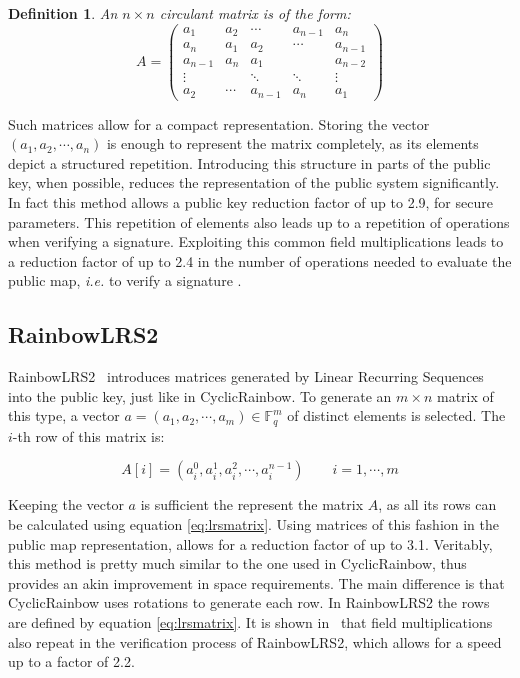 \documentclass{ufsctex/ufsctex}
\newtheorem{definition}{Definition}
\begin{document}
\begin{definition}
An $n \times n$ circulant matrix is of the form:
\begin{equation}
A =
\begin{pmatrix}
a_1     & a_2    & \cdots  & a_{n-1} & a_n     \\
a_n     & a_1    & a_2     & \cdots  & a_{n-1} \\
a_{n-1} & a_n    & a_1     &         & a_{n-2} \\
\vdots  &        & \ddots  & \ddots  & \vdots  \\
a_2     & \cdots & a_{n-1} & a_n     & a_1
\end{pmatrix}
\end{equation}
\end{definition}

Such matrices allow for a compact representation. Storing the vector $(a_1,
a_2, \cdots, a_n)$ is enough to represent the matrix completely, as its
elements depict a structured repetition. Introducing this structure in parts of
the public key, when possible, reduces the representation of the public system
significantly. In fact this method allows a public key reduction factor of up
to 2.9, for secure parameters. This repetition of elements also leads up to a
repetition of operations when verifying a signature. Exploiting this common
field multiplications leads to a reduction factor of up to 2.4 in the number of
operations needed to evaluate the public map, \textit{i.e.} to verify a
signature \cite{petzoldt2013thesis}.

\subsection{RainbowLRS2}

RainbowLRS2~\cite{petzoldt2013thesis} introduces matrices generated by Linear
Recurring Sequences into the public key, just like in CyclicRainbow. To
generate an $m \times n$ matrix of this type, a vector $a = (a_1, a_2, \cdots,
a_m) \in \mathbb{F}_q^m$ of distinct elements is selected. The $i$-th row of
this matrix is:

\begin{equation}\label{eq:lrsmatrix}
A[i] = (a_i^0, a_i^1, a_i^2, \cdots, a_i^{n-1}) \qquad i = 1, \cdots, m
\end{equation}

Keeping the vector $a$ is sufficient the represent the matrix $A$, as all its
rows can be calculated using equation \ref{eq:lrsmatrix}. Using matrices of
this fashion in the public map representation, allows for a reduction factor of
up to 3.1. Veritably, this method is pretty much similar to the one used in
CyclicRainbow, thus provides an akin improvement in space requirements. The
main difference is that CyclicRainbow uses rotations to generate each row. In
RainbowLRS2 the rows are defined by equation \ref{eq:lrsmatrix}. It is shown
in~\cite{petzoldt2013thesis} that field multiplications also repeat in the
verification process of RainbowLRS2, which allows for a speed up to a factor of
2.2.
\end{document}

